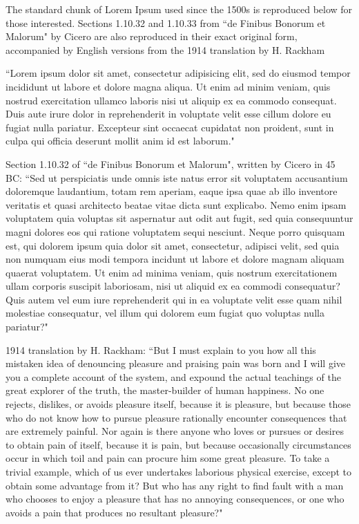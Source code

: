 The standard chunk of Lorem Ipsum used since the 1500s is reproduced below for those interested. Sections 1.10.32 and 1.10.33 from ``de Finibus Bonorum et Malorum" by Cicero are also reproduced in their exact original form, accompanied by English versions from the 1914 translation by H. Rackham

``Lorem ipsum dolor sit amet, consectetur adipisicing elit, sed do eiusmod tempor incididunt ut labore et dolore magna aliqua. Ut enim ad minim veniam, quis nostrud exercitation ullamco laboris nisi ut aliquip ex ea commodo consequat. Duis aute irure dolor in reprehenderit in voluptate velit esse cillum dolore eu fugiat nulla pariatur. Excepteur sint occaecat cupidatat non proident, sunt in culpa qui officia deserunt mollit anim id est laborum."

Section 1.10.32 of ``de Finibus Bonorum et Malorum", written by Cicero in 45 BC: ``Sed ut perspiciatis unde omnis iste natus error sit voluptatem accusantium doloremque laudantium, totam rem aperiam, eaque ipsa quae ab illo inventore veritatis et quasi architecto beatae vitae dicta sunt explicabo. Nemo enim ipsam voluptatem quia voluptas sit aspernatur aut odit aut fugit, sed quia consequuntur magni dolores eos qui ratione voluptatem sequi nesciunt. Neque porro quisquam est, qui dolorem ipsum quia dolor sit amet, consectetur, adipisci velit, sed quia non numquam eius modi tempora incidunt ut labore et dolore magnam aliquam quaerat voluptatem. Ut enim ad minima veniam, quis nostrum exercitationem ullam corporis suscipit laboriosam, nisi ut aliquid ex ea commodi consequatur? Quis autem vel eum iure reprehenderit qui in ea voluptate velit esse quam nihil molestiae consequatur, vel illum qui dolorem eum fugiat quo voluptas nulla pariatur?"

1914 translation by H. Rackham: ``But I must explain to you how all this mistaken idea of denouncing pleasure and praising pain was born and I will give you a complete account of the system, and expound the actual teachings of the great explorer of the truth, the master-builder of human happiness. No one rejects, dislikes, or avoids pleasure itself, because it is pleasure, but because those who do not know how to pursue pleasure rationally encounter consequences that are extremely painful. Nor again is there anyone who loves or pursues or desires to obtain pain of itself, because it is pain, but because occasionally circumstances occur in which toil and pain can procure him some great pleasure. To take a trivial example, which of us ever undertakes laborious physical exercise, except to obtain some advantage from it? But who has any right to find fault with a man who chooses to enjoy a pleasure that has no annoying consequences, or one who avoids a pain that produces no resultant pleasure?"

